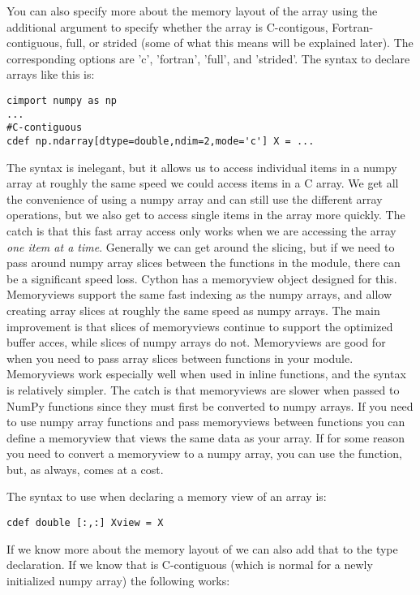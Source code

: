 You can also specify more about the memory layout of the array using the additional argument  to specify whether the array is C-contigous, Fortran-contiguous, full, or strided (some of what this means will be explained later).
The corresponding options are 'c', 'fortran', 'full', and 'strided'.
The syntax to declare arrays like this is:
\begin{lstlisting}
cimport numpy as np
...
#C-contiguous
cdef np.ndarray[dtype=double,ndim=2,mode='c'] X = ...
\end{lstlisting}
The syntax is inelegant, but it allows us to access individual items in a numpy array at roughly the same speed we could access items in a C array.
We get all the convenience of using a numpy array and can still use the different array operations, but we also get to access single items in the array more quickly.
The catch is that this fast array access only works when we are accessing the array \textit{one item at a time}.
Generally we can get around the slicing, but if we need to pass around numpy array slices between the functions in the module, there can be a significant speed loss.
Cython has a memoryview object designed for this.
Memoryviews support the same fast indexing as the numpy arrays, and allow creating array slices at roughly the same speed as numpy arrays.
The main improvement is that slices of memoryviews continue to support the optimized buffer acces, while slices of numpy arrays do not.
Memoryviews are good for when you need to pass array slices between functions in your module.
Memoryviews work especially well when used in inline functions, and the syntax is relatively simpler.
The catch is that memoryviews are slower when passed to NumPy functions since they must first be converted to numpy arrays.
If you need to use numpy array functions and pass memoryviews between functions you can define a memoryview that views the same data as your array.
If for some reason you need to convert a memoryview to a numpy array, you can use the  function, but, as always, comes at a cost.

The syntax to use when declaring a memory view of an array  is:
\begin{lstlisting}
cdef double [:,:] Xview = X
\end{lstlisting}

If we know more about the memory layout of  we can also add that to the type declaration.
If we know that  is C-contiguous (which is normal for a newly initialized numpy array) the following works:

